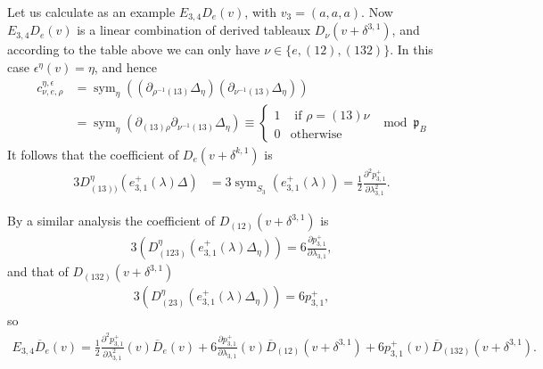 \documentclass[11pt,fleqn]{article}
\newcommand\D{\overline D}
\newcommand\p{\mathfrak p}
\DeclareMathOperator\sym{sym}
\begin{document}
Let us calculate as an example $E_{3,4} D_e(v)$, with $v_3 = (a,a,a)$. 
Now $E_{3,4} D_e(v)$ is a linear combination of derived tableaux $D_\nu
(v + \delta^{3,1})$, and according to the table above we can only have $\nu \in
\{e, (12), (132)\}$. In this case $\epsilon^\eta(v) = \eta$, and hence 
\begin{align*}
c_{\nu,e,\rho}^{\eta,\epsilon} 
&= \sym_\eta \left(
        (\partial_{\rho^{-1}(13)}\Delta_\eta)
        (\partial_{\nu^{-1}(13)}\Delta_\eta)
    \right) \\
& = \sym_\eta (\partial_{(13)\rho} \partial_{\nu^{-1}(13)} \Delta_\eta)\equiv
    \begin{cases}
    1 & \mbox{ if $\rho = (13) \nu$} \\
    0 & \mbox{otherwise}
    \end{cases}
    \mod \p_B 
\end{align*}
It follows that the coefficient of $D_e(v+\delta^{k,1})$ is
\begin{align*}
3 D_{(13))}^\eta(e_{3,1}^+(\lambda) \Delta)
  &= 3 \sym_{S_3} (e_{3,1}^+(\lambda))
  = \frac{1}{2} \frac{\partial^2 p_{3,1}^+}{\partial \lambda_{3,1}^2}.
\end{align*}

By a similar analysis the coefficient of $D_{(12)}(v+\delta^{3,1})$ is
\begin{align*}
3 \left( D_{(123)}^\eta(e_{3,1}^+(\lambda) \Delta_\eta)\right)
    = 6 \frac{\partial p_{3,1}^+}{\partial \lambda_{3,1}},
\end{align*}
and that of $D_{(132)}(v+\delta^{3,1})$
\begin{align*}
3 \left(D_{(23)}^\eta(e_{3,1}^+(\lambda) \Delta_\eta)\right)
    = 6 p_{3,1}^+,
\end{align*}
so
\begin{align*}
E_{3,4} \D_e(v) 
  = \frac{1}{2} \frac{\partial^2 p_{3,1}^+}{\partial \lambda_{3,1}^2}(v) 
    \D_e(v)
  + 6 \frac{\partial p_{3,1}^+}{\partial \lambda_{3,1}}(v) 
    \D_{(12)}(v+\delta^{3,1})
  + 6 p_{3,1}^+(v) \D_{(132)}(v+\delta^{3,1}).
\end{align*}
\end{document}
